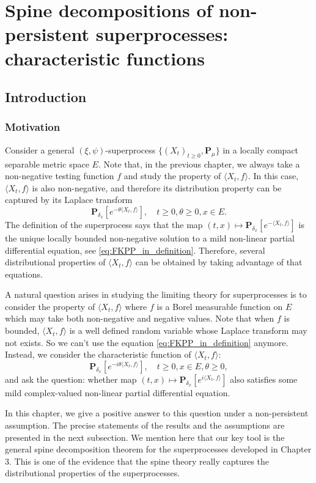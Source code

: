 \documentclass[UTF8]{pkuthss}
\theoremstyle{plain}
\theoremstyle{definition}
\numberwithin{equation}{section}
\begin{document}
\chapter{Spine decompositions of non-persistent superprocesses: characteristic functions}
\section{Introduction}
\subsection{Motivation}
    Consider a general $(\xi,\psi)$-superprocess $\{(X_t)_{t\geq 0}, \mathbf P_\mu\}$ in a locally compact separable metric space $E$.
    Note that, in the previous chapter, we always take a non-negative testing function $f$ and study the property of $\langle X_t,f\rangle$.
    In this case, $\langle X_t,f\rangle$ is also non-negative, and therefore its distribution property can be captured by its Laplace transform 
\[
    \mathbf P_{\delta_x}[e^{-\theta\langle X_t,f\rangle}],\quad t\geq 0, \theta \geq 0, x\in E.
\] 
    The definition of the superprocess says that the map $(t,x)\mapsto \mathbf P_{\delta_x}[e^{- \langle X_t,f\rangle}]$ is the unique locally bounded non-negative solution to a mild non-linear partial differential equation, see \eqref{eq:FKPP_in_definition}.
    Therefore, several distributional properties of $\langle X_t,f\rangle$ can be obtained by taking advantage of that equations.

    A natural question arises in studying the limiting theory for superprocesses is to consider the property of $\langle X_t,f\rangle$ where $f$ is a Borel measurable function on $E$ which may take both non-negative and negative values.
    Note that when $f$ is bounded, $\langle X_t,f\rangle$ is a well defined random variable whose Laplace transform may not exists. 
    So we can't use the equation \eqref{eq:FKPP_in_definition} anymore.
    Instead, we consider the characteristic function of $\langle X_t,f\rangle$:
\[
    \mathbf P_{\delta_x}[e^{-i\theta \langle X_t,f\rangle}],\quad t\geq 0, x\in E, \theta \geq 0,
\]
    and ask the question: whether map $(t,x)\mapsto \mathbf P_{\delta_x}[e^{i\langle X_t,f\rangle}]$ also satisfies some mild complex-valued non-linear partial differential equation.

    In this chapter, we give a positive answer to this question under a non-persistent assumption.
    The precise statements of the results and the assumptions are presented in the next subsection.
    We mention here that our key tool is the general spine decomposition theorem for the superprocesses developed in Chapter 3. 
    This is one of the evidence that the spine theory really captures the distributional properties of the superprocesses. 
\end{document}
